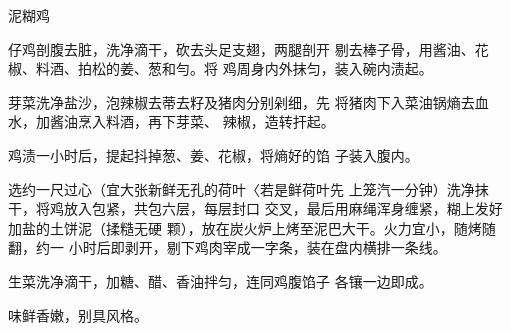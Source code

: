 \begin{recipe}[叫化鸡]{泥糊鸡}

\ingredients




\cooking

\step 仔鸡剖腹去脏，洗净滴干，砍去头足支翅，两腿剖开 剔去棒子骨，用酱油、花椒、料酒、拍松的姜、葱和勻。将 鸡周身内外抹匀，装入碗内渍起。

\step 芽菜洗净盐沙，泡辣椒去蒂去籽及猪肉分别剁细，先 将猪肉下入菜油锅熵去血水，加酱油烹入料酒，再下芽菜、 辣椒，造转扞起。

\step 鸡渍一小时后，提起抖掉葱、姜、花椒，将熵好的馅 子装入腹内。

\step 选约一尺过心（宜大张新鲜无孔的荷叶〈若是鲜荷叶先 上笼汽一分钟）洗净抹干，将鸡放入包紧，共包六层，每层封口 交叉，最后用麻绳浑身缠紧，糊上发好加盐的土饼泥（揉糙无硬 颗），放在炭火炉上烤至泥巴大干。火力宜小，随烤随翻，约一 小时后即剥开，剔下鸡肉宰成一字条，装在盘内横排一条线。

\step 生菜洗净滴干，加糖、醋、香油拌匀，连同鸡腹馅子 各镶一边即成。

\notes

味鲜香嫩，别具风格。

\end{recipe}

